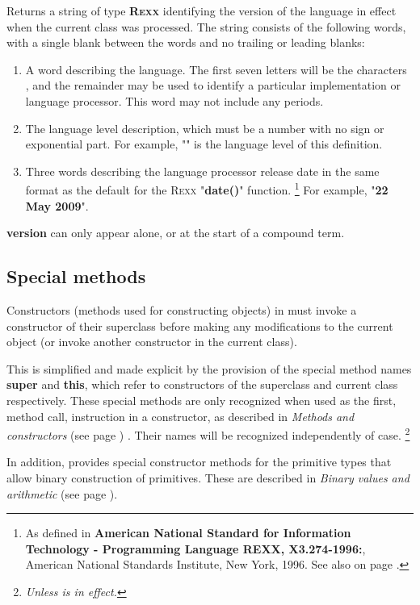 \begin{description}
Returns a string of type \textbf{R\textsc{exx}} identifying the version of the
\nr{} language in effect when the current class was processed.
The string consists of the following words, with a single blank between
the words and no trailing or leading blanks:
\begin{enumerate}
\item A word describing the language.  The first seven letters will be the
characters \textbf{\nr{}}, and the remainder may be used to identify
a particular implementation or language processor.
This word may not include any periods.
\item 
The language level description, which must be a number with no sign or
exponential part.
For example, "\textbf{}" is the language level of this
definition.
\item 
Three words describing the language processor release date in
the same format as the default for the R\textsc{exx} "\textbf{date()}"
function.
\footnote{
As defined in \textbf{American National Standard for Information
Technology - Programming Language REXX, X3.274-1996:}, American
National Standards Institute, New York, 1996. See also
 on page \pageref{refrexxdate}.
}
For example, "\textbf{22 May 2009}".
\end{enumerate}
 \textbf{version} can only appear alone, or at the start of a
compound term.
\end{description}
\subsection{Special methods}\label{refspecm}
 
Constructors (methods used for constructing objects) in \nr{}
must invoke a constructor of their superclass before making any
modifications to the current object (or invoke another constructor in
the current class).
 
This is simplified and made explicit by the provision of the special
method names \textbf{super} and \textbf{this}, which refer to
constructors of the superclass and current class respectively.  These
special methods are only recognized when used as the first, method call,
instruction in a constructor, as described in
 \emph{Methods and constructors} (see page \pageref{refmethcon}) .
Their names will be recognized independently of case.
\footnote{
\emph{Unless  is in effect.
}
}
 
In addition, \nr{} provides special constructor methods for the
primitive types that allow binary construction of primitives.
These are described in  \emph{Binary values and arithmetic} (see page \pageref{refbincon}).
